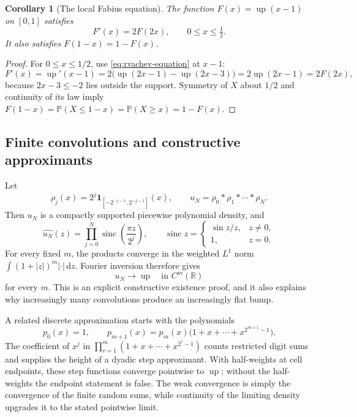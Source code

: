 \documentclass[11pt,oneside]{article}
\newtheorem{corollary}[theorem]{Corollary}
\theoremstyle{definition}
\theoremstyle{remark}
\newcommand{\upf}{\operatorname{up}}
\newcommand{\sinc}{\operatorname{sinc}}
\newcommand{\dd}{\,\mathrm d}
\newcommand{\Pp}{\mathbb P}
\newcommand{\R}{\mathbb R}
\begin{document}
\begin{corollary}[The local Fabius equation]\label{cor:F-differential}
The function $F(x)=\upf(x-1)$ on $[0,1]$ satisfies
\begin{equation}\label{eq:F-local-again}
  F'(x)=2F(2x),\qquad 0\le x\le\tfrac12.
\end{equation}
It also satisfies $F(1-x)=1-F(x)$.
\end{corollary}

\begin{proof}
For $0\le x\le1/2$, use \eqref{eq:rvachev-equation} at $x-1$:
\[
 F'(x)=\upf'(x-1)
 =2\bigl(\upf(2x-1)-\upf(2x-3)\bigr)=2\upf(2x-1)=2F(2x),
\]
because $2x-3\le-2$ lies outside the support.  Symmetry of $X$ about $1/2$ and
continuity of its law imply
$F(1-x)=\Pp(X\le1-x)=\Pp(X\ge x)=1-F(x)$.
\end{proof}

\subsection{Finite convolutions and constructive approximants}

Let
\begin{equation}\label{eq:rho-j}
  \rho_j(x)=2^j\mathbf1_{[-2^{-j-1},2^{-j-1}]}(x),
  \qquad
  u_N=\rho_0*\rho_1*\cdots*\rho_N.
\end{equation}
Then $u_N$ is a compactly supported piecewise polynomial density, and
\begin{equation}\label{eq:uN-Fourier}
  \widehat{u_N}(z)=\prod_{j=0}^{N}\sinc\left(\frac{\pi z}{2^j}\right),
  \qquad \sinc z=\begin{cases}\sin z/z,&z\ne0,\\1,&z=0.\end{cases}
\end{equation}
For every fixed $m$, the products converge in the weighted $L^1$ norm
$\int(1+|z|)^m|\cdot|\dd z$.  Fourier inversion therefore gives
\begin{equation}\label{eq:uN-Cm}
  u_N\longrightarrow\upf\quad\text{in }C^m(\R)
\end{equation}
for every $m$.  This is an explicit constructive existence proof, and it also
explains why increasingly many convolutions produce an increasingly flat bump.

A related discrete approximation starts with the polynomials
\begin{equation}\label{eq:partition-polynomials}
  p_0(x)=1,
  \qquad
  p_{m+1}(x)=p_m(x)\bigl(1+x+\cdots+x^{2^{m+1}-1}\bigr).
\end{equation}
The coefficient of $x^j$ in
$\prod_{r=1}^m(1+x+\cdots+x^{2^r-1})$ counts restricted digit sums and supplies
the height of a dyadic step approximant.  With half-weights at cell endpoints,
these step functions converge pointwise to $\upf$; without the half-weights the
endpoint statement is false.  The weak convergence is simply the convergence of
the finite random sums, while continuity of the limiting density upgrades it to
the stated pointwise limit.
\end{document}
